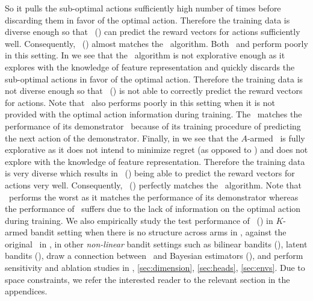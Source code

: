 \documentclass[10pt]{article}
\theoremstyle{plain}
\theoremstyle{definition}
\theoremstyle{remark}
\begin{document}
So it pulls the sub-optimal actions sufficiently high number of times before discarding them in favor of the optimal action.
Therefore the training data is diverse enough so that \pred\ (\gt) can predict the reward vectors for actions sufficiently well. Consequently, \pred\ (\gt) almost matches the \linucb\ algorithm. Both \dptg\ and \ad perform poorly in this setting.
In  we see that the \linucb\ algorithm is not explorative enough as it explores with the knowledge of feature representation and quickly discards the sub-optimal actions in favor of the optimal action. Therefore the training data is not diverse enough so that \pred\ (\gt) is not able to correctly predict the reward vectors for actions. Note that \dptg\ also performs poorly in this setting when it is not provided with the optimal action information during training. The \ad\ matches the performance of its demonstrator \linucb\ because of its training procedure of predicting the next action of the demonstrator.
Finally, in  we see that the $A$-armed \unif\ is fully explorative as it does not intend to minimize regret (as opposed to \ts) and does not explore with the knowledge of feature representation. Therefore the training data is very diverse which results in \pred\ (\gt) being able to predict the reward vectors for actions very well. Consequently, \pred\ (\gt) perfectly matches the \linucb\ algorithm. Note that \ad\ performs the worst as it matches the performance of its demonstrator whereas the performance of \dptg\ suffers due to the lack of information on the optimal action during training.
We also empirically study the test performance of \pred\ (\gt) in $K$-armed bandit setting when there is no structure across arms in , against the original \dpt\ in ,
in other \textit{non-linear} bandit settings such as bilinear bandits (), latent bandits (), draw a connection between \pred\ and Bayesian estimators (), and perform sensitivity and ablation studies in , \ref{sec:dimension}, \ref{sec:heads}, \ref{sec:envs}.
Due to space constraints, we refer the interested reader to the relevant section in the appendices.
\vspace*{-0.7em}
\end{document}
